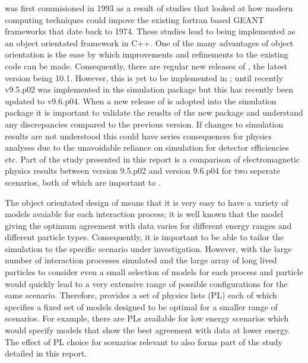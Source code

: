\geant was first commisioned in 1993 as a result of studies that looked at how modern computing techniques could impove the existing fortran based GEANT frameworks that date back to 1974\cite{Agostinelli:2002hh,Brun:118715}.  These studies lead to \geant being implemented as an object orientated framework in C++.  One of the many advantages of object orientation is the ease by which improvements and refinements to the existing code can be made.  Consequently, there are regular new releases of \geant, the latest version being 10.1\cite{g410.1rn}. However, this is yet to be implemented in \lhcb; until recently \geant v9.5.p02 was implemented in the \lhcb simulation package but this has recently been updated to v9.6.p04.  When a new release of \geant is adopted into the \lhcb simulation package it is important to validate the reuslts of the new package and understand any discrepancies compared to the previous version.  If changes to simulation results are not understood this could have series consequences for physics analyses due to the unavoidable reliance on simulation for detector efficiencies etc.  Part of the study presented in this report is a comparison of electromagnetic physics results between \geant version 9.5.p02 and version 9.6.p04 for two seperate scenarios, both of which are important to \lhcb.

The object orientated design of \geant means that it is very easy to have a variety of models avaiable for each interaction process; it is well known that the model giving the optimum agreement with data varies for different energy ranges and different particle types.  Consequently, it is important to be able to tailor the simulation to the specific scenario under investigation.  However, with the large number of interaction processes simulated and the large array of long lived particles to consider even a small selection of models for each process and particle would quickly lead to a very extensive range of possible configurations for the same scenario.  Therefore, \geant provides a set of physics lists (PL) each of which specifies a fixed set of models designed to be optimal for a smaller range of scenarios.  For example, there are PLs available for low energy scenarios which would specify models that show the best agreement with data at lower energy.  The effect of PL choice for scenarios relevant to \lhcb also forms part of the study detailed in this report.


